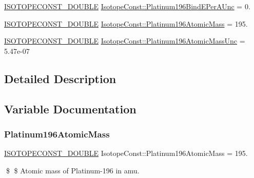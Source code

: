 \begin{DoxyCompactItemize}
\mbox{\hyperlink{group___isotope_const-_macros_ga8f45a7272ce02c0b4c65c44636ed719a}{I\+S\+O\+T\+O\+P\+E\+C\+O\+N\+S\+T\+\_\+\+D\+O\+U\+B\+LE}} \mbox{\hyperlink{group___isotope_const-_platinum-_pt196_ga335e4f4031d05bb402f90b797b891b2c}{Isotope\+Const\+::\+Platinum196\+Bind\+E\+Per\+A\+Unc}} = 0.
\item 
\mbox{\hyperlink{group___isotope_const-_macros_ga8f45a7272ce02c0b4c65c44636ed719a}{I\+S\+O\+T\+O\+P\+E\+C\+O\+N\+S\+T\+\_\+\+D\+O\+U\+B\+LE}} \mbox{\hyperlink{group___isotope_const-_platinum-_pt196_ga07227d8f7fbd587547da1c41e6a0f99f}{Isotope\+Const\+::\+Platinum196\+Atomic\+Mass}} = 195.
\item 
\mbox{\hyperlink{group___isotope_const-_macros_ga8f45a7272ce02c0b4c65c44636ed719a}{I\+S\+O\+T\+O\+P\+E\+C\+O\+N\+S\+T\+\_\+\+D\+O\+U\+B\+LE}} \mbox{\hyperlink{group___isotope_const-_platinum-_pt196_gafec7a98eae9cf6eb022b24dce245021c}{Isotope\+Const\+::\+Platinum196\+Atomic\+Mass\+Unc}} = 5.\+47e-\/07
\end{DoxyCompactItemize}


\subsection{Detailed Description}


\subsection{Variable Documentation}
\mbox{\label{group___isotope_const-_platinum-_pt196_ga07227d8f7fbd587547da1c41e6a0f99f}} 
\subsubsection{\texorpdfstring{Platinum196\+Atomic\+Mass}{Platinum196AtomicMass}}
{\footnotesize\ttfamily \mbox{\hyperlink{group___isotope_const-_macros_ga8f45a7272ce02c0b4c65c44636ed719a}{I\+S\+O\+T\+O\+P\+E\+C\+O\+N\+S\+T\+\_\+\+D\+O\+U\+B\+LE}} Isotope\+Const\+::\+Platinum196\+Atomic\+Mass = 195.}

\$ \$ Atomic mass of Platinum-\/196 in amu. \mbox{\label{group___isotope_const-_platinum-_pt196_gafec7a98eae9cf6eb022b24dce245021c}} 
